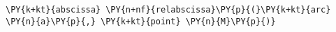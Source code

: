 \begin{Verbatim}[commandchars=\\\{\}]
      \PY{k+kt}{abscissa} \PY{n+nf}{relabscissa}\PY{p}{(}\PY{k+kt}{arc} \PY{n}{a}\PY{p}{,} \PY{k+kt}{point} \PY{n}{M}\PY{p}{)}
\end{Verbatim}
